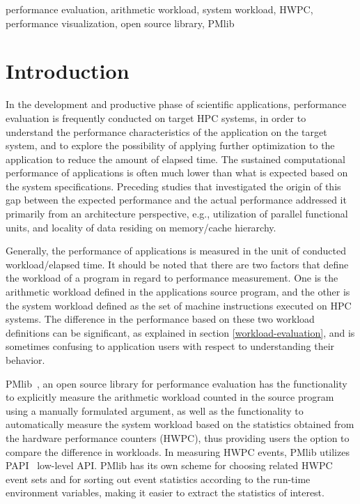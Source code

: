 \documentclass[conference]{IEEEtran}
\begin{document}
\begin{IEEEkeywords}
performance evaluation,
arithmetic workload,
system workload,
HWPC,
performance visualization,
open source library,
PMlib
\end{IEEEkeywords}

\section{Introduction}
In the development and productive phase of scientific applications,
performance evaluation is frequently conducted on target HPC systems,
in order to understand the performance characteristics
of the application on the target system, and to explore the possibility of
applying further optimization to the application to reduce the amount of
elapsed time.
The sustained computational performance of applications is often much
lower than what is expected based on the system specifications.
Preceding studies that investigated the origin of this gap between
the expected performance and the actual performance addressed it
primarily from an architecture perspective, e.g., 
utilization of parallel functional units,
and locality of data residing on memory/cache hierarchy.

Generally, the performance of applications is measured in the unit of
conducted workload/elapsed time.
It should be noted that there are two factors that define the workload
of a program in regard to performance measurement. 
One is the arithmetic workload defined in the applications source program,
and the other is the system workload defined as the set of
machine instructions executed on HPC systems.
The difference in the performance based on these two workload definitions
can be significant, as explained in section \ref{workload-evaluation},
and is sometimes confusing to application users with respect to
understanding their behavior.

PMlib~\cite{PMlib:webpage-public}, an open source library for performance
evaluation has the functionality
to explicitly measure the arithmetic workload counted in the source program
using a manually formulated argument, as well as the functionality
to automatically measure the system workload based on the statistics
obtained from the hardware performance counters (HWPC),
thus providing users the option to compare the difference in workloads.
In measuring HWPC events, PMlib utilizes PAPI~\cite{PAPI:5.6} low-level API.
PMlib has its own scheme for choosing related HWPC event sets and for sorting
out event statistics according to the run-time environment variables, making it
easier to extract the statistics of interest.
\end{document}
